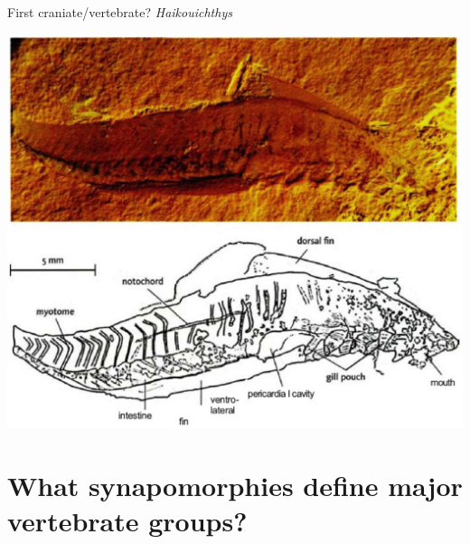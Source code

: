 \begin{frame}[t]
    \begin{adjustwidth}{-2em}{-1.5em}
        \vspace{-3mm}
        First craniate/vertebrate? \textit{Haikouichthys}

        \begin{center}
            \includegraphics[height=0.9\textheight]{Haikouichthys.png}
        \end{center}

    \end{adjustwidth}
\end{frame}


\section[Synapomorphies of major vertebrate groups]{What synapomorphies define
    major vertebrate groups?}


